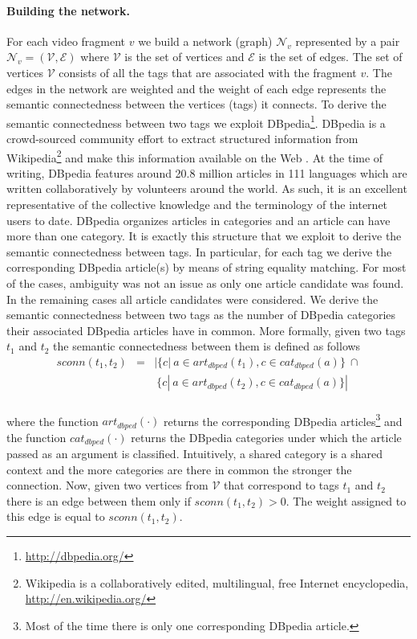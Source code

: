 \paragraph{Building the network.} For each video fragment $v$ we build a network (graph) $\mathcal{N}_v$ represented by a pair $\mathcal{N}_v = (\mathcal{V}, \mathcal{E})$ where $\mathcal{V}$ is the set of vertices and $\mathcal{E}$ is the set of edges. The set of vertices $\mathcal{V}$ consists of all the tags that are associated with the fragment $v$. The edges in the network are weighted and the weight of each edge represents the semantic connectedness between the vertices (tags) it connects. To derive the semantic connectedness between two tags we exploit DBpedia\footnote{\url{http://dbpedia.org/}}. DBpedia is a crowd-sourced community effort to extract structured information from Wikipedia\footnote{Wikipedia is a collaboratively edited, multilingual, free Internet encyclopedia, \url{http://en.wikipedia.org/}} and make this information available on the Web \cite{dbpedia}. At the time of writing, DBpedia features around 20.8 million articles in 111 languages which are written collaboratively by volunteers around the world. As such, it is an excellent representative of the collective knowledge and the terminology of the internet users to date. DBpedia organizes articles in categories and an article can have more than one category. It is exactly this structure that we exploit to derive the semantic connectedness between tags. In particular, for each tag we derive the corresponding DBpedia article(s) by means of string equality matching. For most of the cases, ambiguity was not an issue as only one article candidate was found. In the remaining cases all article candidates were considered. We derive the semantic connectedness between two tags as the number of DBpedia categories their associated DBpedia articles have in common. More formally, given two tags $t_1$ and $t_2$ the semantic connectedness between them is defined as follows
\begin{eqnarray}
 sconn(t_1,t_2) &=& |\{c|~a \in art_{dbped}(t_1), c \in cat_{dbped}(a)\}~\cap      \nonumber \\
   & & ~\{c|~a \in art_{dbped}(t_2), c \in cat_{dbped}(a)\} | \nonumber \\
\end{eqnarray}

where the function $art_{dbped}(\cdot)$ returns the corresponding DBpedia articles\footnote{Most of the time there is only one corresponding DBpedia article.} and the function $cat_{dbped}(\cdot)$ returns the DBpedia categories under which the article passed as an argument is classified. Intuitively, a shared category is a shared context and the more categories are there in common the stronger the connection. Now, given two vertices from $\mathcal{V}$ that correspond to tags $t_1$ and $t_2$ there is an edge between them only if $sconn(t_1,t_2) > 0$. The weight assigned to this edge is equal to $sconn(t_1,t_2)$.

